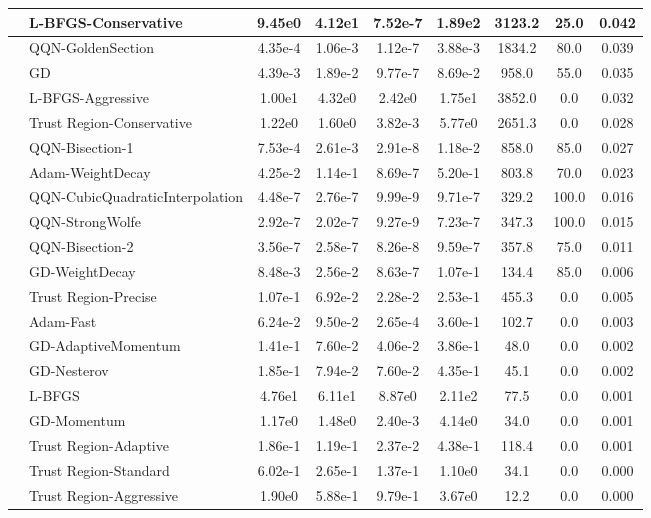 \documentclass{article}
\begin{document}
\begin{longtable}{|l|l|c|c|c|c|c|c|c|}
\hline
 & L-BFGS-Conservative & 9.45e0 & 4.12e1 & 7.52e-7 & 1.89e2 & 3123.2 & 25.0 & 0.042 \\
\hline
 & QQN-GoldenSection & 4.35e-4 & 1.06e-3 & 1.12e-7 & 3.88e-3 & 1834.2 & 80.0 & 0.039 \\
\hline
 & GD & 4.39e-3 & 1.89e-2 & 9.77e-7 & 8.69e-2 & 958.0 & 55.0 & 0.035 \\
\hline
 & L-BFGS-Aggressive & 1.00e1 & 4.32e0 & 2.42e0 & 1.75e1 & 3852.0 & 0.0 & 0.032 \\
\hline
 & Trust Region-Conservative & 1.22e0 & 1.60e0 & 3.82e-3 & 5.77e0 & 2651.3 & 0.0 & 0.028 \\
\hline
 & QQN-Bisection-1 & 7.53e-4 & 2.61e-3 & 2.91e-8 & 1.18e-2 & 858.0 & 85.0 & 0.027 \\
\hline
 & Adam-WeightDecay & 4.25e-2 & 1.14e-1 & 8.69e-7 & 5.20e-1 & 803.8 & 70.0 & 0.023 \\
\hline
 & QQN-CubicQuadraticInterpolation & 4.48e-7 & 2.76e-7 & 9.99e-9 & 9.71e-7 & 329.2 & 100.0 & 0.016 \\
\hline
 & QQN-StrongWolfe & 2.92e-7 & 2.02e-7 & 9.27e-9 & 7.23e-7 & 347.3 & 100.0 & 0.015 \\
\hline
 & QQN-Bisection-2 & 3.56e-7 & 2.58e-7 & 8.26e-8 & 9.59e-7 & 357.8 & 75.0 & 0.011 \\
\hline
 & GD-WeightDecay & 8.48e-3 & 2.56e-2 & 8.63e-7 & 1.07e-1 & 134.4 & 85.0 & 0.006 \\
\hline
 & Trust Region-Precise & 1.07e-1 & 6.92e-2 & 2.28e-2 & 2.53e-1 & 455.3 & 0.0 & 0.005 \\
\hline
 & Adam-Fast & 6.24e-2 & 9.50e-2 & 2.65e-4 & 3.60e-1 & 102.7 & 0.0 & 0.003 \\
\hline
 & GD-AdaptiveMomentum & 1.41e-1 & 7.60e-2 & 4.06e-2 & 3.86e-1 & 48.0 & 0.0 & 0.002 \\
\hline
 & GD-Nesterov & 1.85e-1 & 7.94e-2 & 7.60e-2 & 4.35e-1 & 45.1 & 0.0 & 0.002 \\
\hline
 & L-BFGS & 4.76e1 & 6.11e1 & 8.87e0 & 2.11e2 & 77.5 & 0.0 & 0.001 \\
\hline
 & GD-Momentum & 1.17e0 & 1.48e0 & 2.40e-3 & 4.14e0 & 34.0 & 0.0 & 0.001 \\
\hline
 & Trust Region-Adaptive & 1.86e-1 & 1.19e-1 & 2.37e-2 & 4.38e-1 & 118.4 & 0.0 & 0.001 \\
\hline
 & Trust Region-Standard & 6.02e-1 & 2.65e-1 & 1.37e-1 & 1.10e0 & 34.1 & 0.0 & 0.000 \\
\hline
 & Trust Region-Aggressive & 1.90e0 & 5.88e-1 & 9.79e-1 & 3.67e0 & 12.2 & 0.0 & 0.000 \\

\end{longtable}
\end{document}
